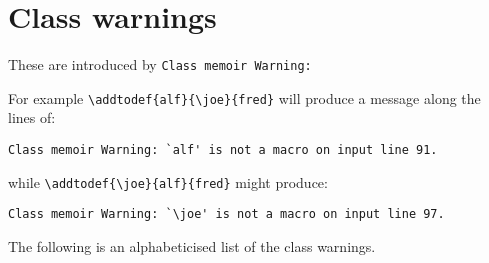
\section{Class warnings}


    These are introduced by \verb?Class memoir Warning:? 

For example
\verb?\addtodef{alf}{\joe}{fred}? will produce a message along the lines of:
\begin{verbatim}
Class memoir Warning: `alf' is not a macro on input line 91.
\end{verbatim}
while 
\verb?\addtodef{\joe}{alf}{fred}? might produce:
\begin{verbatim}
Class memoir Warning: `\joe' is not a macro on input line 97.
\end{verbatim}

    The following is an alphabeticised list of the class warnings.


